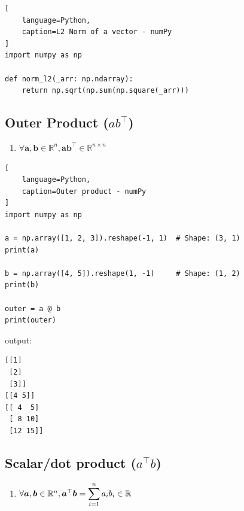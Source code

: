 \begin{lstlisting}[
    language=Python,
    caption=L2 Norm of a vector - numPy
]
import numpy as np

def norm_l2(_arr: np.ndarray):
    return np.sqrt(np.sum(np.square(_arr)))

\end{lstlisting}








\subsection{Outer Product ($ab^\top$) }

\begin{enumerate}
    \item $\forall \bm{a}, \bm{b} \in \mathbb{R}^n, \bm{ab}^\top \in \mathbb{R}^{n\times n}$
    \hfill \cite{mfml/book/mml/Deisenroth-Faisal-Ong}
    
\end{enumerate}


\begin{lstlisting}[
    language=Python,
    caption=Outer product - numPy
]
import numpy as np

a = np.array([1, 2, 3]).reshape(-1, 1)  # Shape: (3, 1)
print(a)

b = np.array([4, 5]).reshape(1, -1)     # Shape: (1, 2)
print(b)

outer = a @ b
print(outer)
\end{lstlisting}

output:
\begin{lstlisting}
[[1]
 [2]
 [3]]
[[4 5]]
[[ 4  5]
 [ 8 10]
 [12 15]]
\end{lstlisting}










\subsection{Scalar/dot product ($a^\top b$)}


\begin{enumerate}
    \item $
        \forall \bm{a}, \bm{b} \in \mathbb{R}^n, 
        \bm{a}^\top \bm{b} = \displaystyle\sum^n_{i=1} a_i b_i \in \mathbb{R}    
    $
    \hfill \cite{mfml/book/mml/Deisenroth-Faisal-Ong}
    
\end{enumerate}



